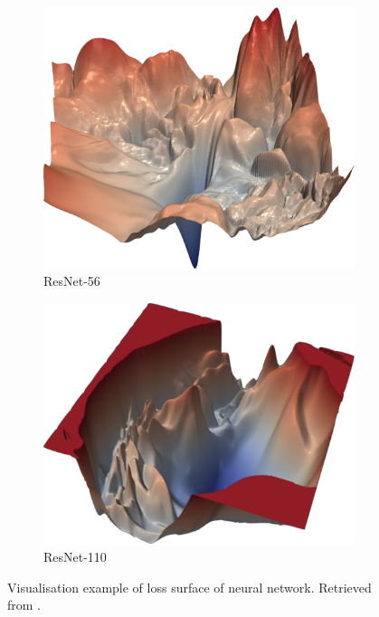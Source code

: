 \begin{figure}
	\centering
	\begin{subfigure}[b]{.49\textwidth}
		\includegraphics[width=\textwidth]{surface1}
		\caption{ResNet-56}
		\label{surf1}
	\end{subfigure}
	\begin{subfigure}[b]{.49\textwidth}
		\includegraphics[width=\textwidth]{surface2}
		\caption{ResNet-110}
		\label{Surf2}
	\end{subfigure}
	\caption{Visualisation example of loss surface of neural network. Retrieved from \cite{li2018visualizing}.}
	\label{surfvis}
\end{figure}

